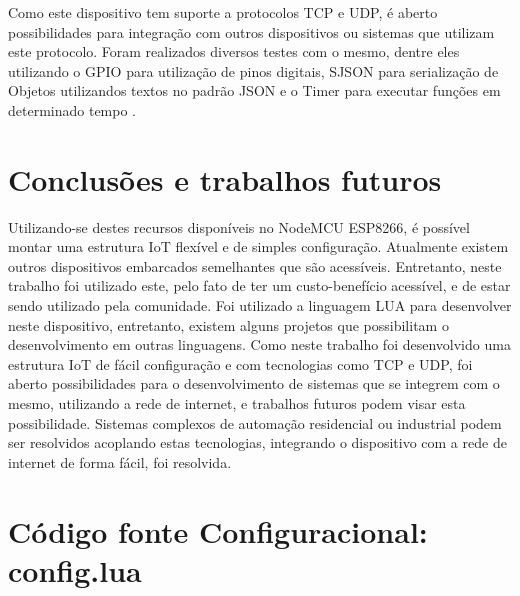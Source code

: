 \documentclass[journal]{IEEEtran}
\begin{document}
Como este dispositivo tem suporte a protocolos TCP e UDP, é aberto possibilidades para integração com outros dispositivos ou sistemas que utilizam este protocolo. Foram realizados diversos testes com o mesmo, dentre eles utilizando o GPIO \cite{nodemcugpio} para utilização de pinos digitais, SJSON para serialização de Objetos utilizandos textos no padrão JSON \cite{nodemcujson} e o Timer para executar funções em determinado tempo \cite{nodemcutimer}.

\section{Conclusões e trabalhos futuros}
Utilizando-se destes recursos disponíveis no NodeMCU ESP8266, é possível montar uma estrutura IoT flexível e de simples configuração. Atualmente existem outros dispositivos embarcados semelhantes que são acessíveis. Entretanto, neste trabalho foi utilizado este, pelo fato de ter um custo-benefício acessível, e de estar sendo utilizado pela comunidade. Foi utilizado a linguagem LUA para desenvolver neste dispositivo, entretanto, existem alguns projetos que possibilitam o desenvolvimento em outras linguagens. Como neste trabalho foi desenvolvido uma estrutura IoT de fácil configuração e com tecnologias como TCP e UDP, foi aberto possibilidades para o desenvolvimento de sistemas que se integrem com o mesmo, utilizando a rede de internet, e trabalhos futuros podem visar esta possibilidade. Sistemas complexos de automação residencial ou industrial podem ser resolvidos acoplando estas tecnologias, integrando o dispositivo com a rede de internet de forma fácil, foi resolvida.


\newpage
\appendices

\section{Código fonte Configuracional: config.lua}
\end{document}
